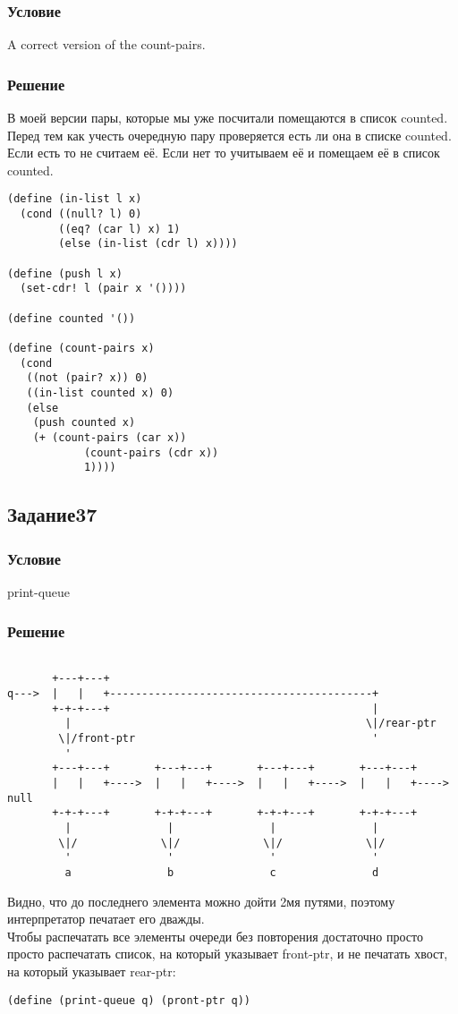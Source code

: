 \documentclass[10pt,a4paper]{article}
\begin{document}
\subsubsection*{Условие}
A correct version of the count-pairs.
\subsubsection*{Решение}
В моей версии пары, которые мы уже посчитали помещаются в список
counted. Перед тем как учесть очередную пару проверяется есть ли она
в списке counted. Если есть то не считаем её. Если нет то учитываем её
и помещаем её в список counted.
\begin{lstlisting}
(define (in-list l x)
  (cond ((null? l) 0)
        ((eq? (car l) x) 1)
        (else (in-list (cdr l) x))))

(define (push l x)
  (set-cdr! l (pair x '())))

(define counted '())

(define (count-pairs x)
  (cond
   ((not (pair? x)) 0)
   ((in-list counted x) 0)
   (else
    (push counted x)
    (+ (count-pairs (car x))
            (count-pairs (cdr x))
            1))))
\end{lstlisting}

\subsection*{Задание37}
\subsubsection*{Условие}
print-queue
\subsubsection*{Решение}
\begin{lstlisting}

       +---+---+
q--->  |   |   +-----------------------------------------+
       +-+-+---+                                         |
         |                                              \|/rear-ptr
        \|/front-ptr                                     '
         '
       +---+---+       +---+---+       +---+---+       +---+---+
       |   |   +---->  |   |   +---->  |   |   +---->  |   |   +---->  null
       +-+-+---+       +-+-+---+       +-+-+---+       +-+-+---+
         |               |               |               |
        \|/             \|/             \|/             \|/
         '               '               '               '
         a               b               c               d

\end{lstlisting}
Видно, что до последнего элемента можно дойти 2мя путями, поэтому
интерпретатор печатает его дважды. \\
Чтобы распечатать все элементы очереди без повторения достаточно
просто просто распечатать список, на который указывает front-ptr, и не
печатать хвост, на который указывает rear-ptr:
\begin{lstlisting}
(define (print-queue q) (pront-ptr q))
\end{lstlisting}
\end{document}
